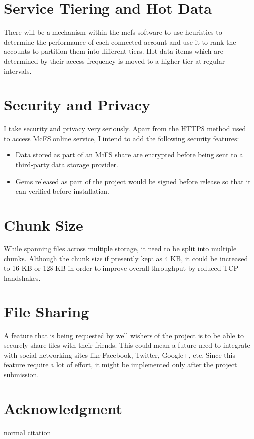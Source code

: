 \section{Service Tiering and Hot Data}
There will be a mechanism within the mcfs software to use heuristics to determine the performance of each connected account and use it to rank the accounts to partition them into different tiers. Hot data items which are determined by their access frequency is moved to a higher tier at regular intervals.
 
\section{Security and Privacy}
I take security and privacy very seriously. Apart from the HTTPS method used to access McFS online service, I intend to add the following security features:

\begin{itemize}
	\item Data stored as part of an McFS share are encrypted before being sent to a third-party data storage provider.
	\item Gems released as part of the project would be signed before release so that it can verified before installation.
\end{itemize}

\section{Chunk Size}
While spanning files across multiple storage, it need to be split into multiple chunks. Although the chunk size if presently kept as 4 KB, it could be increased to 16 KB or 128 KB in order to improve overall throughput by reduced TCP handshakes.

\section{File Sharing}
A feature that is being requested by well wishers of the project is to be able to securely share files with their friends. This could mean a future need to integrate with social networking sites like Facebook, Twitter, Google+, etc. Since this feature require a lot of effort, it might be implemented only after the project submission.

\section*{Acknowledgment}
normal citation~\cite{Byme:curtmola10} 


